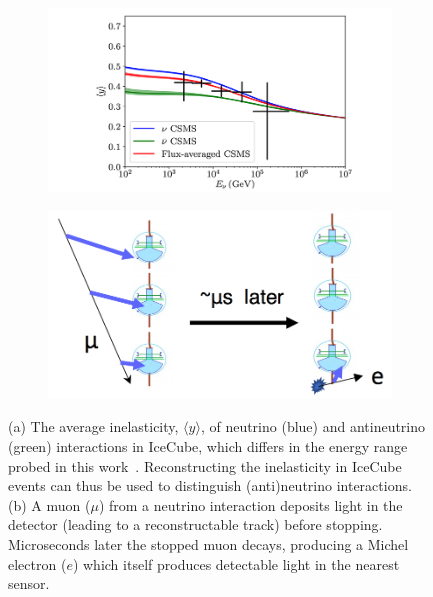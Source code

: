 \documentclass[a4paper,11pt]{article}
\begin{document}
\begin{figure}
    \begin{subfigure}[b]{0.5\textwidth}
    \centering
    \includegraphics[trim=2.0cm 0.0cm 1.0cm 0.0cm, clip=true, width=\linewidth]{images/inelasticity.png}
    \caption{\label{fig:inelasticity}}
    \end{subfigure}
    \begin{subfigure}[b]{0.5\textwidth}
    \centering
    \includegraphics[trim=0.0cm 0.0cm 0.0cm 0.0cm, clip=true, width=\linewidth]{images/michel_electron.png}
    \caption{\label{fig:michel_electron}}
    \end{subfigure}
    \caption{(a) The average inelasticity, $\langle y \rangle$, of neutrino (blue) and antineutrino (green) interactions in IceCube, which differs in the energy range probed in this work~\cite{Aartsen:2018vez}. Reconstructing the inelasticity in IceCube events can thus be used to distinguish (anti)neutrino interactions. (b) A muon ($\mu$) from a neutrino interaction deposits light in the detector (leading to a reconstructable track) before stopping. Microseconds later the stopped muon decays, producing a Michel electron ($e$) which itself produces detectable light in the nearest sensor.}
\end{figure}
\end{document}
